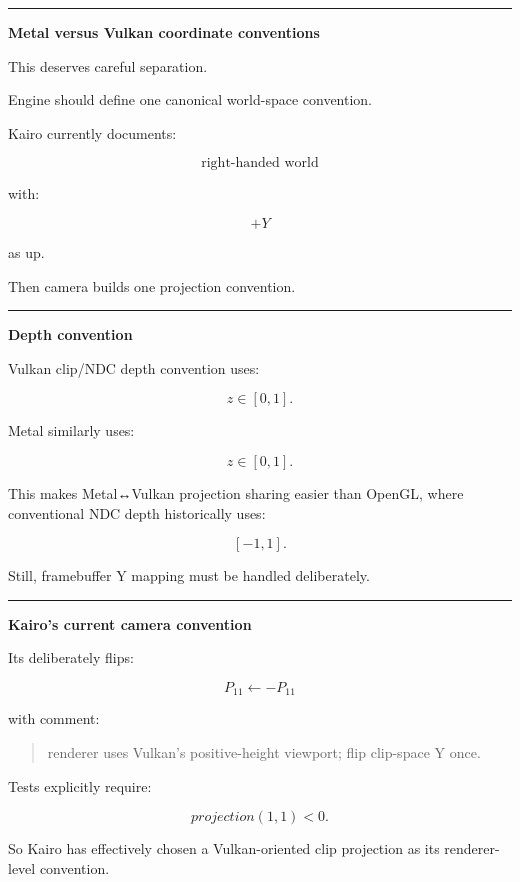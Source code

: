 \begin{center}\rule{0.5\linewidth}{0.5pt}\end{center}

\textbf{Metal versus Vulkan coordinate conventions}

This deserves careful separation.

Engine should define one canonical world-space convention.

Kairo currently documents:

\[
\boxed{
\text{right-handed world}
}
\]

with:

\[
+Y
\]

as up.

Then camera builds one projection convention.

\begin{center}\rule{0.5\linewidth}{0.5pt}\end{center}

\textbf{Depth convention}

Vulkan clip/NDC depth convention uses:

\[
z\in[0,1].
\]

Metal similarly uses:

\[
z\in[0,1].
\]

This makes Metal↔Vulkan projection sharing easier than OpenGL, where conventional NDC depth historically uses:

\[
[-1,1].
\]

Still, framebuffer Y mapping must be handled deliberately.

\begin{center}\rule{0.5\linewidth}{0.5pt}\end{center}

\textbf{Kairo's current camera convention}

Its  deliberately flips:

\[
P_{11}
\leftarrow
-P_{11}
\]

with comment:

\begin{quote}
renderer uses Vulkan's positive-height viewport; flip clip-space Y once.
\end{quote}

Tests explicitly require:

\[
projection(1,1)<0.
\]

So Kairo has effectively chosen a Vulkan-oriented clip projection as its renderer-level convention.

